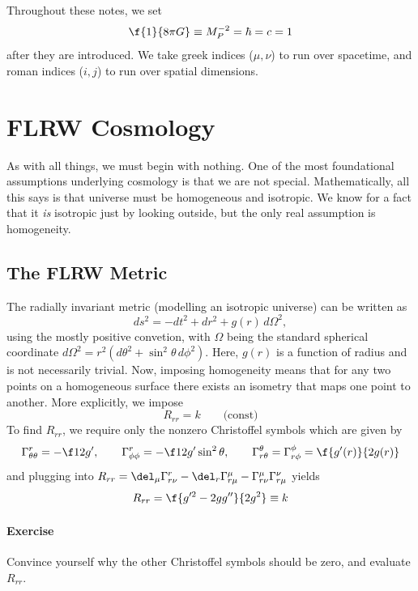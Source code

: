Throughout these notes, we set
\[
\f{1}{8\pi G}\equiv M_P^{-2}=\hbar=c=1
\]
after they are introduced. We take greek indices ($\mu,\nu$) to run over spacetime, and roman indices ($i,j$) to run over spatial dimensions.

\section{FLRW Cosmology}
\label{sec:cosmo}

As with all things, we must begin with nothing. One of the most foundational assumptions underlying cosmology is that we are not special. Mathematically, all this says is that universe must be homogeneous and isotropic. We know for a fact that it \textit{is} isotropic just by looking outside, but the only real assumption is homogeneity.

\subsection{The FLRW Metric}
The radially invariant metric (modelling an isotropic universe) can be written as 
\begin{equation}
\label{eq:isomet}
     ds^2=-dt^2+dr^2 + g(r)\,d\Omega^2,
\end{equation}
using the mostly positive convetion, with $\Omega$ being the standard spherical coordinate $d\Omega^2=r^2(d\theta^2+\sin^2\theta \,d\phi^2)$. Here, $g(r)$ is a function of radius and is not necessarily trivial. Now, imposing homogeneity means that for any two points on a homogeneous surface there exists an isometry that maps one point to another. More explicitly, we impose
\[
R_{rr}=k \qquad \textrm{(const)}
\]
To find $R_{rr}$, we require only the nonzero Christoffel symbols which are given by
\begin{equation}
    \label{eq:chris}
    \Gamma^r_{\theta\theta}=-\f12 g', \qquad \Gamma^r_{\phi\phi}=-\f12 g'\sin^2\theta, 
    \qquad
    \Gamma^\theta_{r\theta}= \Gamma^\phi_{r\phi}=\f{g'(r)}{2g(r)}
\end{equation}
and plugging into $ R_{rr}=\del_\mu\Gamma^r_{r\nu}-\del_r\Gamma^\mu_{r\mu}-\Gamma^\mu_{r\nu}\Gamma^\nu_{r\mu}$ yields
\begin{equation}
    R_{rr}=\f{g'^2-2gg''}{2g^2}\equiv k
\end{equation}
\paragraph{Exercise} Convince yourself why the other Christoffel symbols should be zero, and evaluate $R_{rr}$. 


